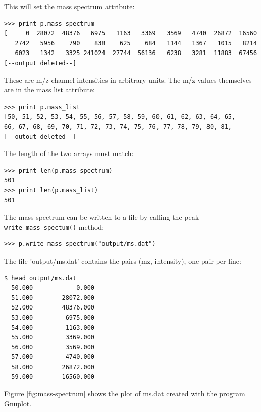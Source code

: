 \noindent
This will set the mass spectrum attribute: 

\begin{verbatim}
>>> print p.mass_spectrum
[     0  28072  48376   6975   1163   3369   3569   4740  26872  16560
   2742   5956    790    838    625    684   1144   1367   1015   8214
   6023   1342   3325 241024  27744  56136   6238   3281  11883  67456
[--output deleted--]
\end{verbatim}

\noindent
These are m/z channel intensities in arbitrary units. The m/z values
themselves are in the mass list attribute:

\begin{verbatim}
>>> print p.mass_list
[50, 51, 52, 53, 54, 55, 56, 57, 58, 59, 60, 61, 62, 63, 64, 65,
66, 67, 68, 69, 70, 71, 72, 73, 74, 75, 76, 77, 78, 79, 80, 81,
[--outout deleted--]
\end{verbatim}

\noindent
The length of the two arrays must match:

\begin{verbatim}
>>> print len(p.mass_spectrum)
501
>>> print len(p.mass_list)
501
\end{verbatim}

The mass spectrum can be written to a file by calling the peak
{\tt write\_mass\_spectum()} method:

\begin{verbatim}
>>> p.write_mass_spectrum("output/ms.dat")
\end{verbatim}

\noindent
The file 'output/ms.dat' contains the pairs (mz, intensity), one pair
per line:

\begin{verbatim}
$ head output/ms.dat
  50.000            0.000
  51.000        28072.000
  52.000        48376.000
  53.000         6975.000
  54.000         1163.000
  55.000         3369.000
  56.000         3569.000
  57.000         4740.000
  58.000        26872.000
  59.000        16560.000
\end{verbatim}

Figure \ref{fig:mass-spectrum} shows the plot of ms.dat created with the
program Gnuplot.


